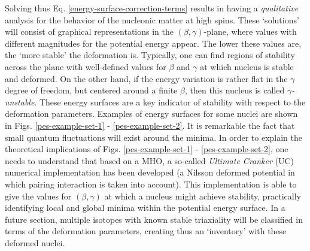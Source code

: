 Solving thus Eq. \ref{energy-surface-correction-terms} results in having a \emph{qualitative} analysis for the behavior of the nucleonic matter at high spins. These `solutions' will consist of graphical representations in the $(\beta,\gamma)$-plane, where values with different magnitudes for the potential energy appear. The lower these values are, the `more stable' the deformation is. Typically, one can find regions of stability across the plane with well-defined values for $\beta$ and $\gamma$ at which nucleus is stable and deformed. On the other hand, if the energy variation is rather flat in the $\gamma$ degree of freedom, but centered around a finite $\beta$, then this nucleus is called \emph{$\gamma$-unstable}. These energy surfaces are a key indicator of stability with respect to the deformation parameters. Examples of energy surfaces for some nuclei are shown in Figs. \ref{pes-example-set-1} - \ref{pes-example-set-2}. It is remarkable the fact that small quantum fluctuations will exist around the minima.
In order to explain the theoretical implications of Figs. \ref{pes-example-set-1} - \ref{pes-example-set-2}, one needs to understand that based on a MHO, a so-called \emph{Ultimate Cranker} (UC) numerical implementation has been developed \cite{bengtsson1989method,bengtsson1990high} (a Nilsson deformed potential in which pairing interaction is taken into account). This implementation is able to give the values for $(\beta,\gamma)$ at which a nucleus might achieve stability, practically identifying local and global minima within the potential energy surface. In a future section, multiple isotopes with known stable triaxiality will be classified in terms of the deformation parameters, creating thus an `inventory' with these deformed nuclei.

